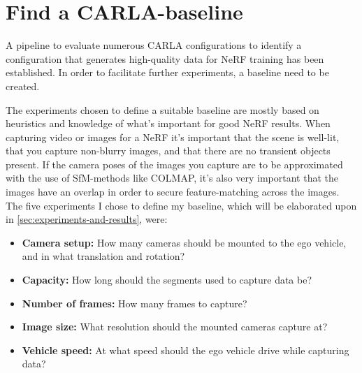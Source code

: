\section{Find a CARLA-baseline}
\begin{comment}
Premise: Have a pipeline to test multiple CARLA-setups
Question: How do I find a CARLA-baseline?

\begin{itemize}
    \item Why do I need a baseline?
    \item How do I find suitable experiments?
    \item How do I evaluate the experiments against each other?
\end{itemize}
\end{comment}

A pipeline to evaluate numerous CARLA configurations to identify a configuration that generates high-quality data for NeRF training has been established. In order to facilitate further experiments, a baseline need to be created.

The experiments chosen to define a suitable baseline are mostly based on heuristics and knowledge of what's important for good NeRF results. When capturing video or images for a NeRF it’s important that the scene is well-lit, that you capture non-blurry images, and that there are no transient objects present. If the camera poses of the images you capture are to be approximated with the use of SfM-methods like COLMAP, it's also very important that the images have an overlap in order to secure feature-matching across the images. The five experiments I chose to define my baseline, which will be elaborated upon in \autoref{sec:experiments-and-results}, were:

\begin{itemize}
    \item \textbf{Camera setup:} How many cameras should be mounted to the ego vehicle, and in what translation and rotation?
    \item \textbf{Capacity:} How long should the segments used to capture data be?
    \item \textbf{Number of frames:} How many frames to capture?
    \item \textbf{Image size:} What resolution should the mounted cameras capture at?
    \item \textbf{Vehicle speed:} At what speed should the ego vehicle drive while capturing data?
\end{itemize}

